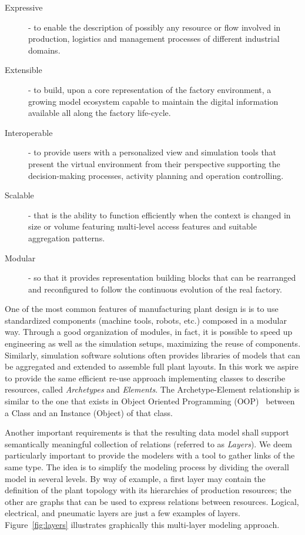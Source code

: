 \begin{description}
\item[Expressive]- to enable the description of possibly any resource or flow involved in production, logistics and management processes of different industrial domains.
\item[Extensible]- to build, upon a core representation of the factory environment, a growing model ecosystem capable to maintain the digital information available all along the factory life-cycle.
\item[Interoperable]- to provide users with a personalized view and simulation tools that present the virtual environment from their perspective supporting the decision-making processes, activity planning and operation controlling.
\item[Scalable]- that is the ability to function efficiently when the context is changed in size or volume featuring multi-level access features and suitable aggregation patterns.
\item[Modular]- so that it provides representation building blocks that can be rearranged and reconfigured to follow the continuous evolution  of the real factory.
\end{description}


One of the most common features of manufacturing plant design is is to use standardized components (machine tools, robots, etc.) composed in a modular way. 
Through a good organization of modules, in fact, it is possible to speed up engineering as well as the simulation setups, maximizing the reuse of components. 
Similarly, simulation software solutions often provides libraries of models that can be aggregated and extended to assemble full plant layouts.
In this work we aspire to provide the same efficient re-use approach implementing classes to describe resources, called \textit{Archetypes} and \textit{Elements}. %
The Archetype-Element relationship is similar to the one that exists in Object Oriented Programming (OOP)~\cite{wolfgang1994design} between a Class and an Instance (Object) of that class.

Another important requirements is that the resulting data model shall support semantically meaningful collection of relations (referred to as \textit{Layers}). 
We deem particularly important to provide the modelers with a tool to gather links of the same type. 
The idea is to simplify the modeling process by dividing the overall model in several levels. 
By way of example, a first layer may contain the definition of the plant topology with its hierarchies of production resources; the other are graphs that can be used to express relations between resources. 
Logical, electrical, and pneumatic layers are just a few examples of layers.
Figure~\ref{fig:layers} illustrates graphically this multi-layer modeling approach. 

